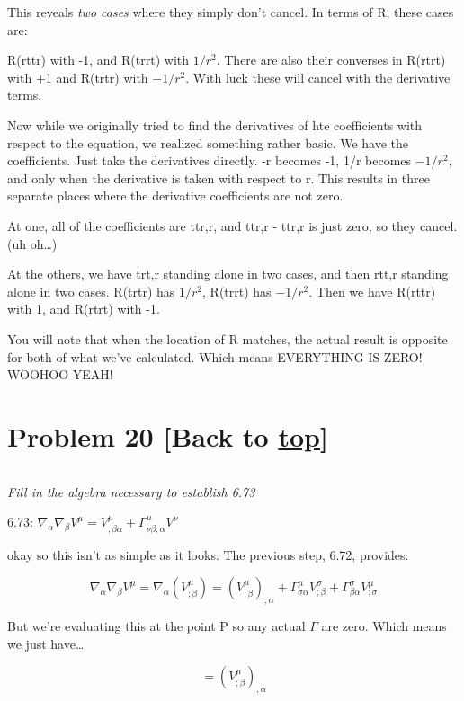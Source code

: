 \documentclass[landscape,letterpaper,10pt,english]{article}
\begin{document}
This reveals \emph{two cases} where they simply don't cancel. In terms
of R, these cases are:

R(rttr) with -1, and R(trrt) with \(1/r^2\). There are also their
converses in R(rtrt) with +1 and R(trtr) with \(-1/r^2\). With luck
these will cancel with the derivative terms.

Now while we originally tried to find the derivatives of hte
coefficients with respect to the equation, we realized something rather
basic. We have the coefficients. Just take the derivatives directly. -r
becomes -1, 1/r becomes \(-1/r^2\), and only when the derivative is
taken with respect to r. This results in three separate places where the
derivative coefficients are not zero.

At one, all of the coefficients are ttr,r, and ttr,r - ttr,r is just
zero, so they cancel. (uh oh\ldots)

At the others, we have trt,r standing alone in two cases, and then rtt,r
standing alone in two cases. R(trtr) has \(1/r^2\), R(trrt) has
\(-1/r^2\). Then we have R(rttr) with 1, and R(rtrt) with -1.

You will note that when the location of R matches, the actual result is
opposite for both of what we've calculated. Which means EVERYTHING IS
ZERO! WOOHOO YEAH!

    \hypertarget{problem-20-back-to-top}{%
\section{\texorpdfstring{Problem 20 {[}Back to
\hyperref[toc]{top}{]}}{Problem 20 {[}Back to {]}}}\label{problem-20-back-to-top}}

\[\label{P20}\]

\emph{Fill in the algebra necessary to establish 6.73}

6.73:
\(\nabla_\alpha \nabla_\beta V^\mu = V^\mu_{,\beta\alpha} + \Gamma^\mu_{\nu\beta,\alpha} V^\nu\)

okay so this isn't as simple as it looks. The previous step, 6.72,
provides:

\[ \nabla_\alpha \nabla_\beta V^\mu = \nabla_\alpha (V^\mu_{;\beta}) = (V^\mu_{;\beta})_{,\alpha} + \Gamma^\mu_{\sigma\alpha} V^\sigma_{;\beta} + \Gamma^\sigma_{\beta\alpha} V^\mu_{;\sigma} \]

But we're evaluating this at the point P so any actual \(\Gamma\) are
zero. Which means we just have\ldots{}

\[= (V^\mu_{;\beta})_{,\alpha} \]
\end{document}
